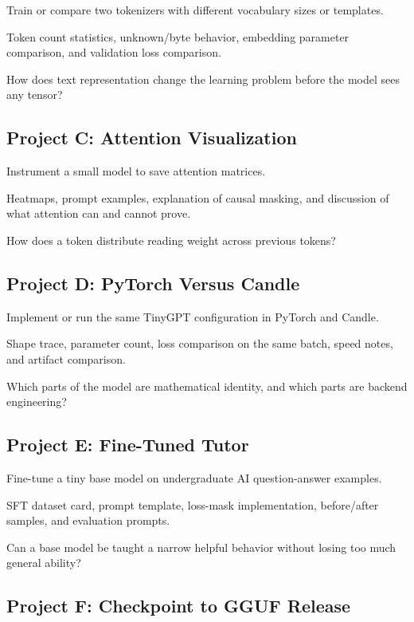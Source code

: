  Train or compare two tokenizers with different vocabulary sizes or templates.

 Token count statistics, unknown/byte behavior, embedding parameter comparison, and validation loss comparison.

 How does text representation change the learning problem before the model sees any tensor?

\subsection*{Project C: Attention Visualization}

 Instrument a small model to save attention matrices.

 Heatmaps, prompt examples, explanation of causal masking, and discussion of what attention can and cannot prove.

 How does a token distribute reading weight across previous tokens?

\subsection*{Project D: PyTorch Versus Candle}

 Implement or run the same TinyGPT configuration in PyTorch and Candle.

 Shape trace, parameter count, loss comparison on the same batch, speed notes, and artifact comparison.

 Which parts of the model are mathematical identity, and which parts are backend engineering?

\subsection*{Project E: Fine-Tuned Tutor}

 Fine-tune a tiny base model on undergraduate AI question-answer examples.

 SFT dataset card, prompt template, loss-mask implementation, before/after samples, and evaluation prompts.

 Can a base model be taught a narrow helpful behavior without losing too much general ability?

\subsection*{Project F: Checkpoint to GGUF Release}

